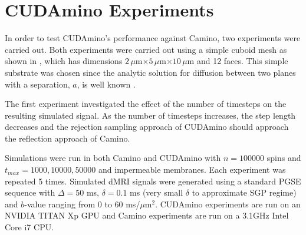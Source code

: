 \section{CUDAmino Experiments}
\label{sec:cudamino_experiments}
In order to test CUDAmino's performance against Camino, two experiments were carried out.
Both experiments were carried out using a simple cuboid mesh as shown in , which has dimensions $2\,\mu$m$\times5\,\mu$m$\times10\,\mu$m and 12 faces.
This simple substrate was chosen since the analytic solution for diffusion between two planes with a separation, $a$, is well known \cite{Callaghan1995,Linse1995}.

The first experiment investigated the effect of the number of timesteps on the resulting simulated signal.
As the number of timesteps increases, the step length decreases and the rejection sampling approach of CUDAmino should approach the reflection approach of Camino.

Simulations were run in both Camino and CUDAmino with $n = 100000$ spins and $t_{max} = 1000, 10000, 50000$ and impermeable membranes. Each experiment was repeated 5 times. 
Simulated \ac{dMRI} signals were generated using a standard \ac{PGSE} sequence with $\Delta = 50$ ms, $\delta = 0.1$ ms (very small $\delta$ to approximate \ac{SGP} regime) and $b$-value ranging from 0 to 60 ms/$\mu$m$^2$.
CUDAmino experiments are run on an NVIDIA TITAN Xp \ac{GPU} and Camino experiments are run on a 3.1GHz Intel Core i7 \ac{CPU}. 



